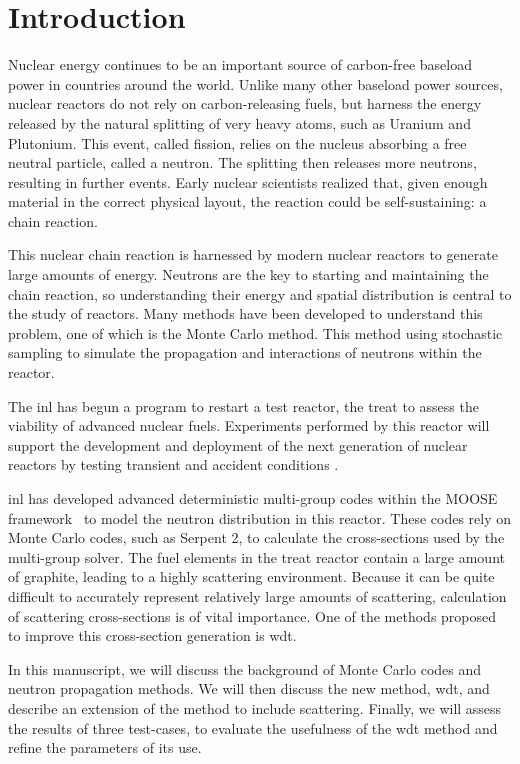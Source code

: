 
\chapter{Introduction}
\label{chap:intro}

Nuclear energy continues to be an important source of carbon-free
baseload power in countries around the world. Unlike many other
baseload power sources, nuclear reactors do not rely on
carbon-releasing fuels, but harness the energy released by the
natural splitting of very heavy atoms, such as Uranium and
Plutonium. This event, called fission, relies on the nucleus absorbing
a free neutral particle, called a neutron. The splitting then releases
more neutrons, resulting in further events. Early nuclear scientists
realized that, given enough material in the correct physical layout,
the reaction could be self-sustaining: a chain reaction.

This nuclear chain reaction is harnessed by modern nuclear reactors
to generate large amounts of energy. Neutrons are the key to starting
and maintaining the chain reaction, so understanding their energy and
spatial distribution is central to the study of reactors. Many methods
have been developed to understand this problem, one of which is the
Monte Carlo method. This method using stochastic sampling to simulate
the propagation and interactions of neutrons within the reactor.

The \gls{inl} has begun a program to restart a test reactor, the
\gls{treat} to assess the viability of advanced nuclear
fuels. Experiments performed by this reactor will
support the development and deployment of the next generation of
nuclear reactors by testing transient and accident conditions \cite{webtreat}.

\gls{inl} has developed advanced deterministic multi-group codes
within the MOOSE framework~\cite{gaston2009} to model the neutron
distribution in this reactor. These codes rely on Monte Carlo codes,
such as Serpent 2, 
to calculate the cross-sections used by the
multi-group solver. The fuel elements in the \gls{treat} reactor
contain a large amount of graphite, leading to a highly scattering
environment. Because it can be quite difficult to accurately represent
relatively large amounts of scattering, calculation of scattering cross-sections is of
vital importance. One of the methods proposed to improve this
cross-section generation is \gls{wdt}.

In this manuscript, we will discuss the background of Monte Carlo
codes and neutron propagation methods. We will then discuss the new
method, \gls{wdt}, and describe an extension of the method to include
scattering. Finally, we will assess the results of three test-cases,
to evaluate the usefulness of the \gls{wdt} method and refine the
parameters of its use.



